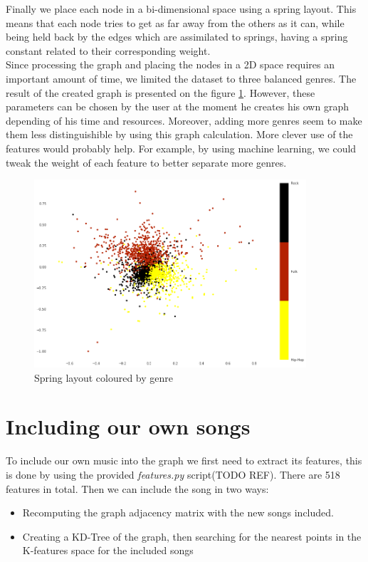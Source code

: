 \documentclass[11pt,a4paper,twoside]{article}
\begin{document}
Finally we place each node in a bi-dimensional space using a spring layout. This means that each node tries to get as far away from the others as it can, while being held back by the edges which are assimilated to springs, having a spring constant related to their corresponding weight.\\

Since processing the graph and placing the nodes in a 2D space requires an important amount of time, we limited the dataset to three balanced genres. The result of the created graph is presented on the figure \ref{fig:spring_layout}. However, these parameters can be chosen by the user at the moment he creates his own graph depending of his time and resources. Moreover, adding more genres seem to make them less distinguishible by using this graph calculation. More clever use of the features would probably help. For example, by using machine learning, we could tweak the weight of each feature to better separate more genres.

\begin{figure}[H]
\centering
\includegraphics[width=0.9\textwidth] {figures/graph_2}
\caption{Spring layout coloured by genre}
\label{fig:spring_layout}
\end{figure}
\section{Including our own songs}

To include our own music into the graph we first need to extract its features, this is done by using
the provided \textit{features.py} script(TODO REF). There are 518 features in total.
Then we can include the song in two ways:
\begin{itemize}
\item Recomputing the graph adjacency matrix with the new songs included.

\item Creating a KD-Tree of the graph, then searching for the nearest points in the K-features space for the included songs
\end{itemize}
\end{document}
